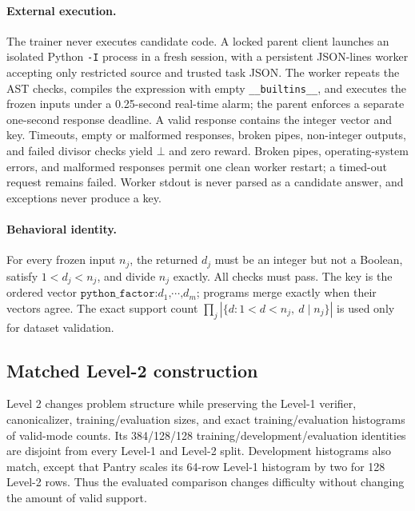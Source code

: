 \documentclass{article}
\newcommand{\1}{\mathbf 1}
\theoremstyle{remark}
\theoremstyle{definition}
\theoremstyle{plain}
\begin{document}
\paragraph{External execution.}
\label{app:python-process}
The trainer never executes candidate code. A locked parent client launches
an isolated Python \texttt{-I} process in a fresh session, with a persistent
JSON-lines worker accepting only restricted source and trusted task JSON.
The worker repeats the AST checks, compiles the expression with empty
\texttt{\_\_builtins\_\_}, and executes the frozen inputs under a
0.25-second real-time alarm; the parent enforces a separate one-second
response deadline. A valid response contains the integer vector and key.
Timeouts, empty or malformed responses, broken pipes, non-integer outputs,
and failed divisor checks yield $\bot$ and zero reward. Broken pipes,
operating-system errors, and malformed responses permit one clean worker
restart; a timed-out request remains failed. Worker stdout is never parsed
as a candidate answer, and exceptions never produce a key.

\paragraph{Behavioral identity.}
\label{app:python-identity}
For every frozen input $n_j$, the returned $d_j$ must be an integer but not a
Boolean, satisfy $1<d_j<n_j$, and divide $n_j$ exactly. All checks must pass.
The key is the ordered vector
$\texttt{python\_factor:}d_1\texttt{,}\cdots\texttt{,}d_m$;
programs merge exactly when their vectors agree. The exact support count
$\prod_j|\{d:1<d<n_j,\ d\mid n_j\}|$ is used only for dataset validation.

\subsection{Matched Level-2 construction}
\label{app:data-levels}

Level 2 changes problem structure while preserving the Level-1 verifier,
canonicalizer, training/evaluation sizes, and exact training/evaluation
histograms of valid-mode counts. Its 384/128/128
training/development/evaluation identities are disjoint from every Level-1
and Level-2 split. Development histograms also match, except that Pantry
scales its 64-row Level-1 histogram by two for 128 Level-2 rows. Thus the
evaluated comparison changes difficulty without changing the amount of
valid support.
\end{document}
